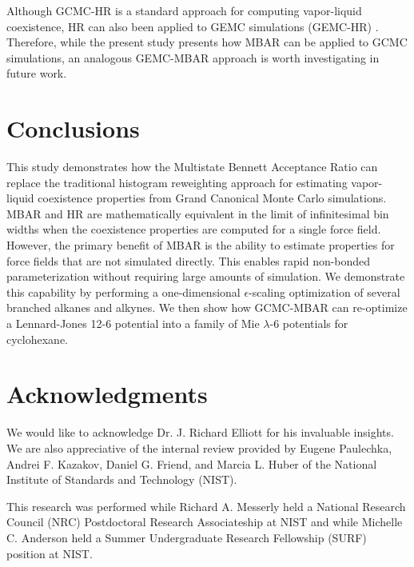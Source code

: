 \documentclass[journal=jced,manuscript=article]{achemso}
\begin{document}
Although GCMC-HR is a standard approach for computing vapor-liquid coexistence, HR can also been applied to GEMC simulations (GEMC-HR) \cite{Boulougouris2010}. Therefore, while the present study presents how MBAR can be applied to GCMC simulations, an analogous GEMC-MBAR approach is worth investigating in future work.

%

\section{Conclusions} \label{sec: Conclusions}

This study demonstrates how the Multistate Bennett Acceptance Ratio can replace the traditional histogram reweighting approach for estimating vapor-liquid coexistence properties from Grand Canonical Monte Carlo simulations. MBAR and HR are mathematically equivalent in the limit of infinitesimal bin widths when the coexistence properties are computed for a single force field. However, the primary benefit of MBAR is the ability to estimate properties for force fields that are not simulated directly. This enables rapid non-bonded parameterization without requiring large amounts of simulation. We demonstrate this capability by performing a one-dimensional $\epsilon$-scaling optimization of several branched alkanes and alkynes. We then show how GCMC-MBAR can re-optimize a Lennard-Jones 12-6 potential into a family of Mie $\lambda$-6 potentials for cyclohexane. 

\section{Acknowledgments}

We would like to acknowledge Dr. J. Richard Elliott for his invaluable insights. We are also appreciative of the internal review provided by Eugene Paulechka, Andrei F. Kazakov, Daniel G. Friend, and Marcia L. Huber of the National Institute of Standards and Technology (NIST).

This research was performed while Richard A. Messerly held a National Research Council (NRC) Postdoctoral Research Associateship at NIST and while Michelle C. Anderson held a Summer Undergraduate Research Fellowship (SURF) position at NIST. 
\end{document}
